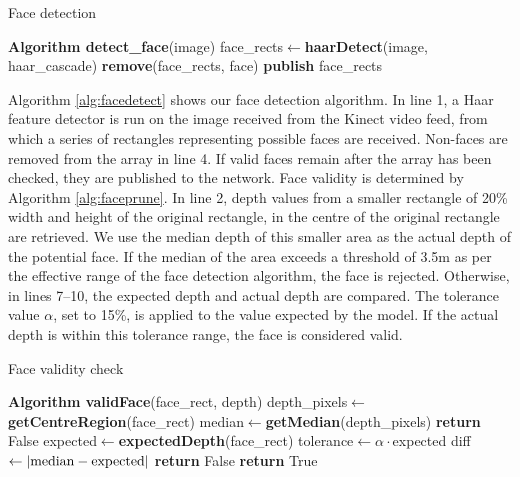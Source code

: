 \documentclass[conference]{IEEEtran}
\begin{document}
\begin{algorithm}
  \caption{Face detection}
  \label{alg:facedetect}
  \begin{algorithmic}[1]
    \State \textbf{Algorithm detect\_face}\textnormal{(image)}
    \State face\_rects$\leftarrow$\textbf{haarDetect}(image, haar\_cascade)
    \State \textbf{remove}(face\_rects, face)
    \EndIf
    \EndFor
    \State \textbf{publish} face\_rects
  \end{algorithmic}
\end{algorithm}
Algorithm \ref{alg:facedetect} shows our face detection algorithm. In line 1, a Haar feature detector is run on the image received from the Kinect video feed, from which a series of rectangles representing possible faces are received. Non-faces are removed from the array in line 4. If valid faces remain after the array has been checked, they are published to the network. Face validity is determined by Algorithm \ref{alg:faceprune}. In line 2, depth values from a smaller rectangle of 20\% width and height of the original rectangle, in the centre of the original rectangle are retrieved. We use the median depth of this smaller area as the actual depth of the potential face. If the median of the area exceeds a threshold of 3.5m as per the effective range of the face detection algorithm, the face is rejected. Otherwise, in lines 7--10, the expected depth and actual depth are compared. The tolerance value $\alpha$, set to 15\%, is applied to the value expected by the model. If the actual depth is within this tolerance range, the face is considered valid.
\begin{algorithm}
  \caption{Face validity check}
  \label{alg:faceprune}
  \begin{algorithmic}[1]
    \State \textbf{Algorithm validFace}\textnormal{(face\_rect, depth)}
    \State depth\_pixels$\leftarrow$\textbf{getCentreRegion}(face\_rect)
    \State median$\leftarrow$\textbf{getMedian}(depth\_pixels)
    \State \textbf{return} False
    \Else
    \State expected$\leftarrow$\textbf{expectedDepth}(face\_rect)
    \State tolerance$\leftarrow \alpha \cdot$expected
    \State diff$\leftarrow \left|\textnormal{median}-\textnormal{expected}\right|$
    \State \textbf{return} False
    \EndIf
    \EndIf
    \State \textbf{return} True
  \end{algorithmic}
\end{algorithm}
\end{document}
